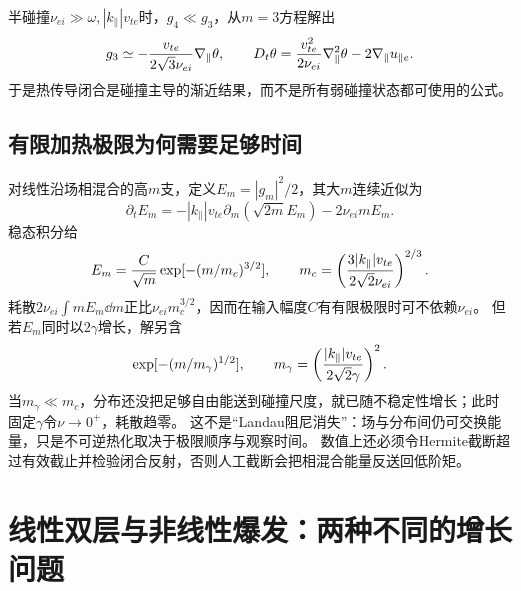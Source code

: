 半碰撞$\nu_{ei}\gg\omega,|k_\parallel|v_{te}$时，$g_4\ll g_3$，从$m=3$方程解出
\begin{equation}
 g_3\simeq-{v_{te}\over2\sqrt3\nu_{ei}}\nabla_\parallel\theta,\qquad
 D_t\theta={v_{te}^2\over2\nu_{ei}}\nabla_\parallel^2\theta-2\nabla_\parallel u_{\parallel e}.
\end{equation}
于是热传导闭合是碰撞主导的渐近结果，而不是所有弱碰撞状态都可使用的公式。

\subsection{有限加热极限为何需要足够时间}
对线性沿场相混合的高$m$支，定义$E_m=|g_m|^2/2$，其大$m$连续近似为
\begin{equation}
 \partial_tE_m=-|k_\parallel|v_{te}\partial_m(\sqrt{2m}E_m)-2\nu_{ei}mE_m.
\end{equation}
稳态积分给
\begin{equation}
 E_m={C\over\sqrt m}\exp[-(m/m_c)^{3/2}],\qquad
 m_c=\left({3|k_\parallel|v_{te}\over2\sqrt2\nu_{ei}}\right)^{2/3}.
\end{equation}
耗散$2\nu_{ei}\int mE_m\dd m$正比$\nu_{ei}m_c^{3/2}$，因而在输入幅度$C$有有限极限时可不依赖$\nu_{ei}$。
但若$E_m$同时以$2\gamma$增长，解另含
\begin{equation}
 \exp[-(m/m_\gamma)^{1/2}],\qquad
 m_\gamma=\left({|k_\parallel|v_{te}\over2\sqrt2\gamma}\right)^2.
\end{equation}
当$m_\gamma\ll m_c$，分布还没把足够自由能送到碰撞尺度，就已随不稳定性增长；此时固定$\gamma$令$\nu\to0^+$，耗散趋零。
这不是“Landau阻尼消失”：场与分布间仍可交换能量，只是不可逆热化取决于极限顺序与观察时间。
数值上还必须令Hermite截断超过有效截止并检验闭合反射，否则人工截断会把相混合能量反送回低阶矩。



\section{线性双层与非线性爆发：两种不同的增长问题}
